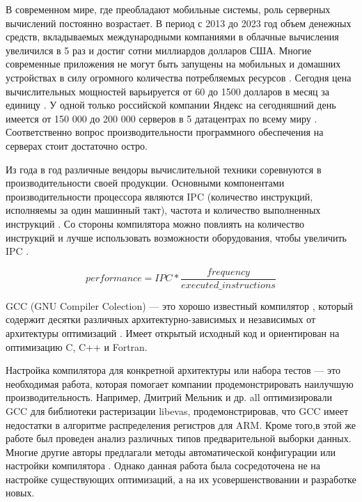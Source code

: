 
{\actuality} В современном мире, где преобладают мобильные системы, роль серверных вычислений постоянно возрастает. В период с 2013 до 2023 год объем денежных средств, вкладываемых  международными компаниями в облачные вычисления увеличился в 5 раз \cite{spendingCloud,alam2020cloud} и достиг сотни миллиардов долларов США. Многие современные приложения не могут быть запущены на мобильных и домашних устройствах в силу огромного количества потребляемых ресурсов \cite{marinescu2022cloud}.
Сегодня цена вычислительных мощностей варьируется от 60 до 1500  долларов в месяц за единицу \cite{costCloud}.  У одной только российской компании Яндекс на сегодняшний день имеется от 150 000  до 200 000 серверов в 5 датацентрах по всему миру \cite{Yndx2}. Соответственно вопрос производительности программного обеспечения на серверах стоит достаточно остро.

Из года в год различные вендоры вычислительной техники соревнуются в производительности своей продукции. Основными компонентами производительности процессора являются IPC (количество инструкций, исполняемы за один машинный такт), частота и количество выполненных инструкций \cite{hennessy2011computer}. Со стороны компилятора можно повлиять на количество инструкций и лучше использовать возможности оборудования, чтобы увеличить IPC \cite{alvares2021instruction}.

$$performance = IPC * \dfrac{frequency}{executed\_instructions}$$

GCC (GNU Compiler Colection) — это хорошо известный компилятор \cite{schmitt2020performance}, который содержит десятки различных архитектурно-зависимых и независимых от архитектуры оптимизаций \cite {rodriguez2021compiler}. Имеет открытый исходный код и ориентирован на оптимизацию C, C++ и Fortran.

Настройка компилятора для конкретной архитектуры или набора тестов — это необходимая работа, которая помогает компании продемонстрировать наилучшую производительность. Например, Дмитрий Мельник и др. all \cite{melnik2010case} оптимизировали GCC для библиотеки растеризации libevas, продемонстрировав, что GCC имеет недостатки в алгоритме распределения регистров для ARM. Кроме того,в этой же работе был проведен анализ различных типов предварительной выборки данных. Многие другие авторы предлагали методы автоматической конфигурации или настройки компилятора \cite{plotnikov2013automatic,ashouri2018survey,cereda2020collaborative}. Однако данная работа была сосредоточена не на настройке существующих оптимизаций, а на их усовершенствовании и разработке новых.


